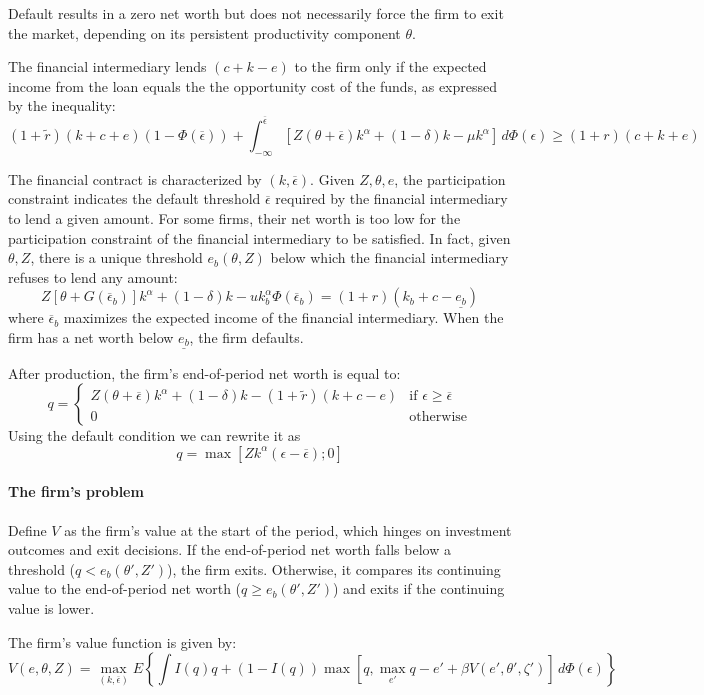 \documentclass[12pt]{report}
\begin{document}
Default results in a zero net worth but does not necessarily force the firm to exit the market, depending on its
persistent productivity component $\theta$.

The financial intermediary lends $(c + k - e)$ to the firm only if the expected income from the loan equals the
the opportunity cost of the funds, as expressed by the inequality:
\[
(1+\widetilde{r} )(k+c+e)(1-\Phi(\overline{\epsilon}))+\int_{-\infty}^{\overline{\epsilon}}[Z(\theta+\overline{\epsilon})
k^\alpha+(1-\delta)k-\mu k^\alpha] \,d\Phi(\epsilon) \geq (1+r)(c+k+e)
\]

The financial contract is characterized by $(k,\overline{\epsilon})$. Given $Z,\theta,e$, the participation constraint
indicates the default threshold $\overline{\epsilon}$ required by the financial intermediary to lend a given amount. For
some firms, their net worth is too low for the participation constraint of the financial intermediary to be satisfied.
In fact, given $\theta, Z$, there is a unique threshold $e_b(\theta, Z)$ below which the financial intermediary
refuses to lend any amount:
\[
Z[\theta+G(\overline{\epsilon}_b )]k^\alpha+(1-\delta)k-uk_b^\alpha\Phi (\overline{\epsilon}_b)=(1+r)(k_b+c-\underline{e_b})
\]
where $\overline{\epsilon}_b$ maximizes the expected income of the financial intermediary. When the firm has a net worth
below $\underline{e_b}$, the firm defaults.

After production, the firm's end-of-period net worth is equal to:
\[
q = \begin{cases}
  Z(\theta+\overline{\epsilon})k^\alpha +(1-\delta)k-(1+\widetilde{r})(k+c-e) & \text{if } \epsilon\geq \overline{\epsilon} \\
  0 & \text{otherwise}
\end{cases}
\]
Using the default condition we can rewrite it as 
\[q = \max[Zk^\alpha(\epsilon-\overline{\epsilon});0]\]

\paragraph{The firm's problem}
Define $V$ as the firm's value at the start of the period, which hinges on investment outcomes and exit decisions. If
the end-of-period net worth falls below a threshold ($q < e_b(\theta', Z')$), the firm exits. Otherwise, it compares its
continuing value to the end-of-period net worth ($q \geq e_b(\theta', Z')$) and exits if the continuing value is lower.

The firm's value function is given by:
\[
V(e,\theta,Z) = \max_{(k,\overline{\epsilon})}E\left\{\int I(q)q + (1-I(q))\max[q,\max_{e'}q-e'+\beta V(e',\theta',
\zeta')]\,d\Phi(\epsilon)\right\}
\]
\end{document}

